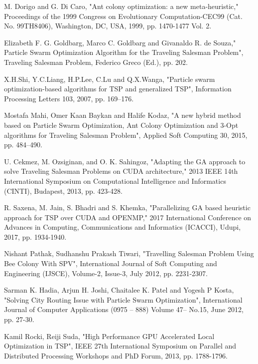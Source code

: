 \documentclass[conference]{IEEEtran}
\begin{document}
\begin{thebibliography}{00}
 M. Dorigo and G. Di Caro, "Ant colony optimization: a new meta-heuristic," Proceedings of the 1999 Congress on Evolutionary Computation-CEC99 (Cat. No. 99TH8406), Washington, DC, USA, 1999, pp. 1470-1477 Vol. 2.

 Elizabeth F. G. Goldbarg, Marco C. Goldbarg and Givanaldo R. de Souza," Particle Swarm Optimization Algorithm for the Traveling Salesman Problem", Traveling Salesman Problem, Federico Greco (Ed.), pp. 202.

  X.H.Shi, Y.C.Liang, H.P.Lee, C.Lu and Q.X.Wanga, "Particle swarm optimization-based algorithms for TSP and generalized TSP", Information Processing Letters 103, 2007, pp. 169–176.

 Mostafa Mahi, Omer Kaan Baykan and Halife Kodaz, "A new hybrid method based on Particle Swarm Optimization, Ant Colony Optimization and 3-Opt algorithms for Traveling Salesman Problem", Applied Soft Computing 30, 2015, pp. 484–490.

 U. Cekmez, M. Ozsiginan, and O. K. Sahingoz, "Adapting the GA approach to solve Traveling Salesman Problems on CUDA architecture," 2013 IEEE 14th International Symposium on Computational Intelligence and Informatics (CINTI), Budapest, 2013, pp. 423-428.

 R. Saxena, M. Jain, S. Bhadri and S. Khemka, "Parallelizing GA based heuristic approach for TSP over CUDA and OPENMP," 2017 International Conference on Advances in Computing, Communications and Informatics (ICACCI), Udupi, 2017, pp. 1934-1940.

 Nishant Pathak, Sudhanshu Prakash Tiwari, "Travelling Salesman Problem Using Bee Colony With SPV", International Journal of Soft Computing and Engineering (IJSCE), Volume-2, Issue-3, July 2012, pp.  2231-2307.

 Sarman K. Hadia, Arjun H. Joshi, Chaitalee K. Patel and Yogesh P Kosta, "Solving City Routing Issue with Particle Swarm Optimization", International Journal of Computer Applications (0975 – 888) Volume 47– No.15, June 2012, pp. 27-30.

 Kamil Rocki, Reiji Suda, "High Performance GPU Accelerated Local Optimization in TSP", IEEE 27th International Symposium on Parallel and Distributed Processing Workshops and PhD Forum, 2013, pp. 1788-1796.



\end{thebibliography}
\end{document}
